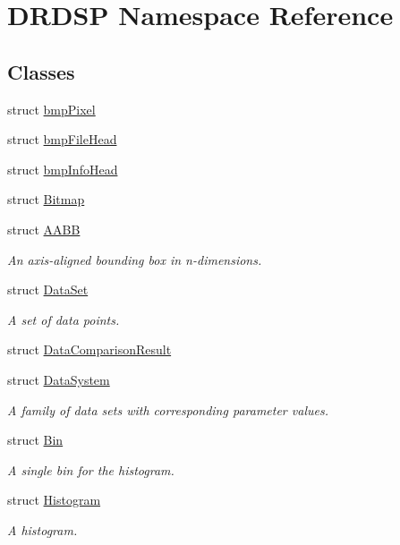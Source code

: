 \hypertarget{namespace_d_r_d_s_p}{\section{D\-R\-D\-S\-P Namespace Reference}
\label{namespace_d_r_d_s_p}
}
\subsection*{Classes}
\begin{DoxyCompactItemize}
\item 
struct \hyperlink{struct_d_r_d_s_p_1_1bmp_pixel}{bmp\-Pixel}
\item 
struct \hyperlink{struct_d_r_d_s_p_1_1bmp_file_head}{bmp\-File\-Head}
\item 
struct \hyperlink{struct_d_r_d_s_p_1_1bmp_info_head}{bmp\-Info\-Head}
\item 
struct \hyperlink{struct_d_r_d_s_p_1_1_bitmap}{Bitmap}
\item 
struct \hyperlink{struct_d_r_d_s_p_1_1_a_a_b_b}{A\-A\-B\-B}
\begin{DoxyCompactList}\small\item\em An axis-\/aligned bounding box in n-\/dimensions. \end{DoxyCompactList}\item 
struct \hyperlink{struct_d_r_d_s_p_1_1_data_set}{Data\-Set}
\begin{DoxyCompactList}\small\item\em A set of data points. \end{DoxyCompactList}\item 
struct \hyperlink{struct_d_r_d_s_p_1_1_data_comparison_result}{Data\-Comparison\-Result}
\item 
struct \hyperlink{struct_d_r_d_s_p_1_1_data_system}{Data\-System}
\begin{DoxyCompactList}\small\item\em A family of data sets with corresponding parameter values. \end{DoxyCompactList}\item 
struct \hyperlink{struct_d_r_d_s_p_1_1_bin}{Bin}
\begin{DoxyCompactList}\small\item\em A single bin for the histogram. \end{DoxyCompactList}\item 
struct \hyperlink{struct_d_r_d_s_p_1_1_histogram}{Histogram}
\begin{DoxyCompactList}\small\item\em A histogram. \end{DoxyCompactList}\item 

\end{DoxyCompactItemize}
